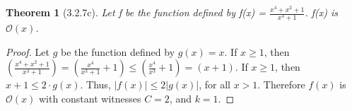 \documentclass[a4paper, 12pt]{article}
\theoremstyle{plain}
\newtheorem*{theorem*}{Theorem}
\begin{document}
	
	\begin{theorem*}[3.2.7c]
		Let f be the function defined by f(x) = $\frac{x^{4} + x^{2} + 1}{x^{3} + 1}$. \newline f(x) is $\mathcal{O}(x)$.
	\end{theorem*}
	
	\begin{proof}
		Let $g$ be the function defined by $g(x) = x$. If $x \ge 1$, then \newline \newline \indent \indent $\left( \frac{x^{4} + x^{2} + 1}{x^{3} + 1} \right) = \left( \frac{x^{4}}{x^{3} + 1} + 1 \right) \le \left( \frac{x^{4}}{x^{3}} + 1 \right) = \left( x + 1 \right)$.
		\newline \newline If $x \ge 1$, then $x + 1 \le 2 \cdot g(x)$. Thus, $|f(x)| \le 2|g(x)|$, for all $x > 1$. Therefore $f(x)$ is $\mathcal{O}(x)$ with constant witnesses $C = 2$, and $k = 1$.
	\end{proof}
\end{document}
